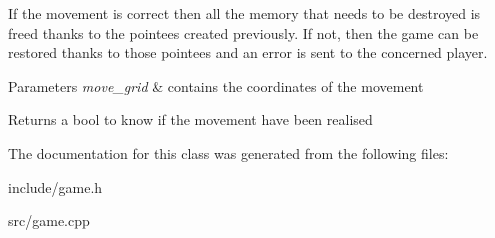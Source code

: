 If the movement is correct then all the memory that needs to be destroyed is freed thanks to the pointees created previously. If not, then the game can be restored thanks to those pointees and an error is sent to the concerned player.


\begin{DoxyParams}{Parameters}
{\em move\+\_\+grid} & contains the coordinates of the movement \\
\hline
\end{DoxyParams}
\begin{DoxyReturn}{Returns}
a bool to know if the movement have been realised 
\end{DoxyReturn}


The documentation for this class was generated from the following files\+:\begin{DoxyCompactItemize}
\item 
include/game.\+h\item 
src/game.\+cpp\end{DoxyCompactItemize}
